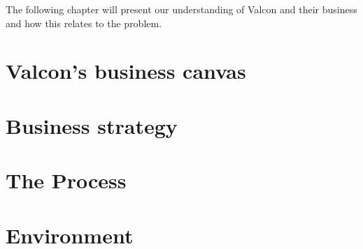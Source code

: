 The following chapter will present our understanding of Valcon and their business and how this relates to the problem.

\section{Valcon's business canvas}

\section{Business strategy}

\section{The Process}

\section{Environment}
